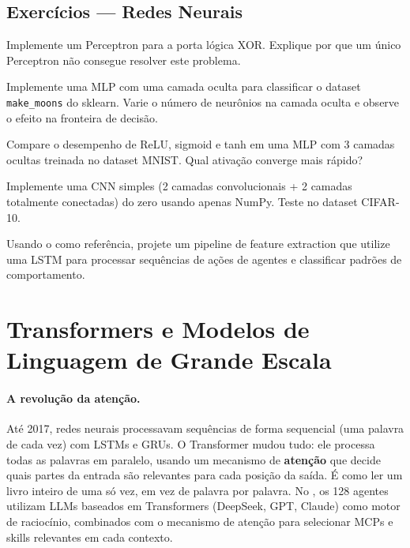 \subsection{Exercícios — Redes Neurais}
\begin{exercicio}
Implemente um Perceptron para a porta lógica XOR. Explique por que um único
Perceptron não consegue resolver este problema.
\end{exercicio}
\begin{exercicio}
Implemente uma MLP com uma camada oculta para classificar o dataset
\texttt{make\_moons} do sklearn. Varie o número de neurônios na camada oculta
e observe o efeito na fronteira de decisão.
\end{exercicio}
\begin{exercicio}
Compare o desempenho de ReLU, sigmoid e tanh em uma MLP com 3 camadas
ocultas treinada no dataset MNIST. Qual ativação converge mais rápido?
\end{exercicio}
\begin{exercicio}
Implemente uma CNN simples (2 camadas convolucionais + 2 camadas totalmente
conectadas) do zero usando apenas NumPy. Teste no dataset CIFAR-10.
\end{exercicio}
\begin{exercicio}
Usando o \opencodeeco{} como referência, projete um pipeline de feature
extraction que utilize uma LSTM para processar sequências de ações de agentes
e classificar padrões de comportamento.
\end{exercicio}
\section{Transformers e Modelos de Linguagem de Grande Escala}
\label{sec:transformers-llms}
\nivelavancado

\paragraph{A revolução da atenção.} Até 2017, redes neurais processavam
sequências de forma sequencial (uma palavra de cada vez) com LSTMs e GRUs.
O Transformer mudou tudo: ele processa todas as palavras em paralelo,
usando um mecanismo de \textbf{atenção} que decide quais partes da entrada
são relevantes para cada posição da saída. É como ler um livro inteiro de
uma só vez, em vez de palavra por palavra. No \opencodeeco{}, os 128 agentes
utilizam LLMs baseados em Transformers (DeepSeek, GPT, Claude) como motor
de raciocínio, combinados com o mecanismo de atenção para selecionar MCPs e
skills relevantes em cada contexto.

